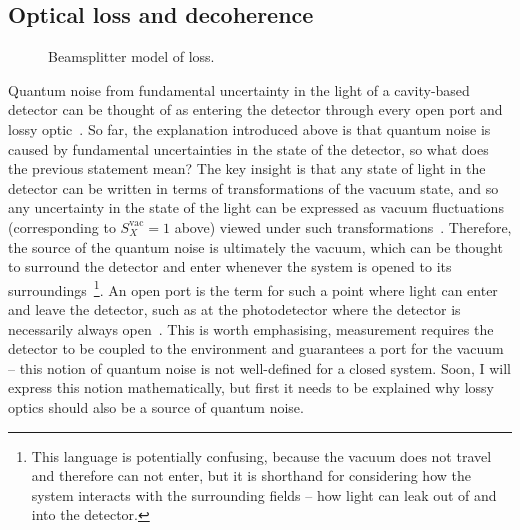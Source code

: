 \subsection{Optical loss and decoherence}

\begin{figure}
	\centering
	\caption{Beamsplitter model of loss.}
	\label{fig:beamsplitter_loss}
\end{figure}

Quantum noise from fundamental uncertainty in the light of a cavity-based detector can be thought of as entering the detector through every open port and lossy optic~\cite{}. So far, the explanation introduced above is that quantum noise is caused by fundamental uncertainties in the state of the detector, so what does the previous statement mean? %
The key insight is that any state of light in the detector can be written in terms of transformations of the vacuum state, and so any uncertainty in the state of the light can be expressed as vacuum fluctuations (corresponding to $S_X^\text{vac}=1$ above) viewed under such transformations~\cite{}. Therefore, the source of the quantum noise is ultimately the vacuum, which can be thought to surround the detector and enter whenever the system is opened to its surroundings~\footnote{This language is potentially confusing, because the vacuum does not travel and therefore can not enter, but it is shorthand for considering how the system interacts with the surrounding fields -- how light can leak out of and into the detector.}. An open port is the term for such a point where light can enter and leave the detector, such as at the photodetector where the detector is necessarily always open~\cite{}. This is worth emphasising, measurement requires the detector to be coupled to the environment and guarantees a port for the vacuum -- this notion of quantum noise is not well-defined for a closed system. Soon, I will express this notion mathematically, but first it needs to be explained why lossy optics should also be a source of quantum noise.

